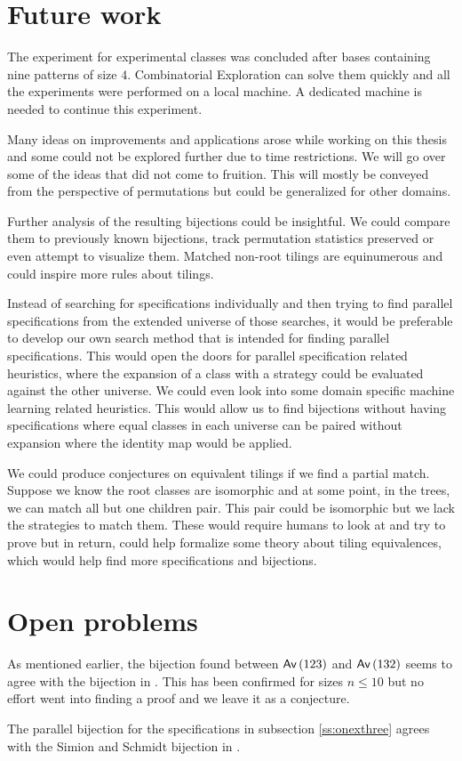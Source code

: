 \label{ch:conclusion}

\section{Future work}\label{s:fw}
The experiment for experimental classes was concluded after bases containing nine patterns of size $4$. Combinatorial Exploration can solve them quickly and all the experiments were performed on a local machine. A dedicated machine is needed to continue this experiment.

Many ideas on improvements and applications arose while working on this thesis and some could not be explored further due to time restrictions. We will go over some of the ideas that did not come to fruition. This will mostly be conveyed from the perspective of permutations but could be generalized for other domains.

Further analysis of the resulting bijections could be insightful. We could compare them to previously known bijections, track permutation statistics preserved or even attempt to visualize them. Matched non-root tilings are equinumerous and could inspire more rules about tilings.

Instead of searching for specifications individually and then trying to find parallel specifications from the extended universe of those searches, it would be preferable to develop our own search method that is intended for finding parallel specifications. This would open the doors for parallel specification related heuristics, where the expansion of a class with a strategy could be evaluated against the other universe. We could even look into some domain specific machine learning related heuristics. This would allow us to find bijections without having specifications where equal classes in each universe can be paired without expansion where the identity map would be applied.

We could produce conjectures on equivalent tilings if we find a partial match. Suppose we know the root classes are isomorphic and at some point, in the trees, we can match all but one children pair. This pair could be isomorphic but we lack the strategies to match them. These would require humans to look at and try to prove but in return, could help formalize some theory about tiling equivalences, which would help find more specifications and bijections.

\section{Open problems}
As mentioned earlier, the bijection found between $\textsf{Av}\left(123\right)$ and $\textsf{Av}\left(132\right)$ seems to agree with the \citeauthor{simionandschmidt} bijection in \cite{simionandschmidt}. This has been confirmed for sizes $n \leq 10$ but no effort went into finding a proof and we leave it as a conjecture.
\begin{conjecture}\label{con:ss}
The parallel bijection for the specifications in subsection \ref{ss:onexthree} agrees with the Simion and Schmidt bijection in \cite{simionandschmidt}.
\end{conjecture}

